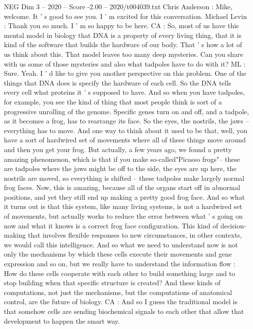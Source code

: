 \begin{textsample}{NEG Dim 3 – 2020 – Score -2.00 – 2020/t004039.txt}  \label{ex:f3_neg_067}
Chris Anderson : Mike, welcome.
It ' s good to see you.
I ' m excited for this conversation.
Michael Levin : Thank you so much.
I ' m so happy to be here.
CA : So, most of us have this mental model in biology that DNA is a property of every living thing, that it is kind of the software that builds the hardware of our body.
That ' s how a lot of us think about this.
That model leaves too many deep mysteries.
Can you share with us some of those mysteries and also what tadpoles have to do with it?
ML : Sure.
Yeah.
I ' d like to give you another perspective on this problem.
One of the things that DNA does is specify the hardware of each cell.
So the DNA tells every cell what proteins it ' s supposed to have.
And so when you have tadpoles, for example, you see the kind of thing that most people think is sort of a progressive unrolling of the genome.
Specific genes turn on and off, and a tadpole, as it becomes a frog, has to rearrange its face.
So the eyes, the nostrils, the jaws -- everything has to move.
And one way to think about it used to be that, well, you have a sort of hardwired set of movements where all of these things move around and then you get your frog.
But actually, a few years ago, we found a pretty amazing phenomenon, which is that if you make so-called"Picasso frogs"-- these are tadpoles where the jaws might be off to the side, the eyes are up here, the nostrils are moved, so everything is shifted -- these tadpoles make largely normal frog faces.
Now, this is amazing, because all of the organs start off in abnormal positions, and yet they still end up making a pretty good frog face.
And so what it turns out is that this system, like many living systems, is not a hardwired set of movements, but actually works to reduce the error between what ' s going on now and what it knows is a correct frog face configuration.
This kind of decision-making that involves flexible responses to new circumstances, in other contexts, we would call this intelligence.
And so what we need to understand now is not only the mechanisms by which these cells execute their movements and gene expression and so on, but we really have to understand the information flow : How do these cells cooperate with each other to build something large and to stop building when that specific structure is created?
And these kinds of computations, not just the mechanisms, but the computations of anatomical control, are the future of biology.
CA : And so I guess the traditional model is that somehow cells are sending biochemical signals to each other that allow that development to happen the smart way.

\end{textsample}
